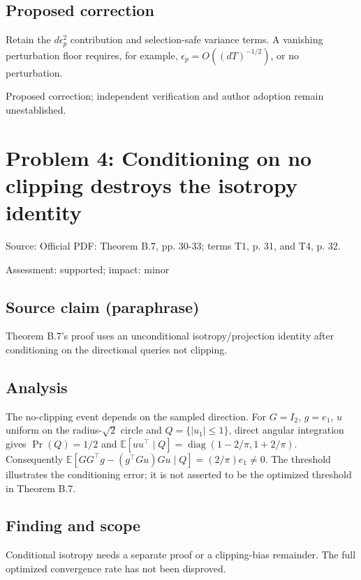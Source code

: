 \documentclass[11pt]{article}
\begin{document}
\subsection*{Proposed correction}

Retain the \(d\epsilon_p^2\) contribution and selection-safe variance terms. A vanishing perturbation floor requires, for example, \(\epsilon_p=O((dT)^{-1/2})\), or no perturbation.

Proposed correction; independent verification and author adoption remain unestablished.

\section*{Problem 4: Conditioning on no clipping destroys the isotropy identity}

Source: Official PDF: Theorem B.7, pp. 30-33; terms T1, p. 31, and T4, p. 32.

Assessment: supported; impact: minor

\subsection*{Source claim (paraphrase)}

Theorem B.7's proof uses an unconditional isotropy/projection identity after conditioning on the directional queries not clipping.

\subsection*{Analysis}

The no-clipping event depends on the sampled direction. For \(G=I_2\), \(g=e_1\), \(u\) uniform on the radius-\(\sqrt2\) circle and \(Q=\{|u_1|\le1\}\), direct angular integration gives \(\Pr(Q)=1/2\) and \(\mathbb E[uu^\top\mid Q]=\operatorname{diag}(1-2/\pi,1+2/\pi)\). Consequently \(\mathbb E[GG^\top g-(g^\top Gu)Gu\mid Q]=(2/\pi)e_1\ne0\). The threshold illustrates the conditioning error; it is not asserted to be the optimized threshold in Theorem B.7.

\subsection*{Finding and scope}

Conditional isotropy needs a separate proof or a clipping-bias remainder. The full optimized convergence rate has not been disproved.
\end{document}
